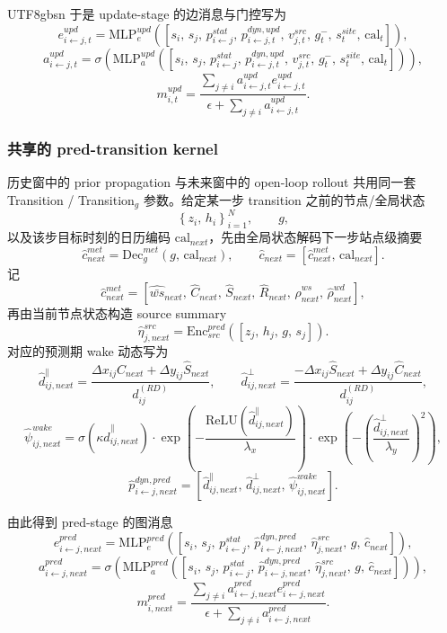 \documentclass[11pt]{article}
\begin{document}
\begin{CJK}{UTF8}{gbsn}
于是 update-stage 的边消息与门控写为
\[
e_{i\leftarrow j,t}^{upd}=\mathrm{MLP}_e^{upd}\left([s_i,\, s_j,\, p_{i\leftarrow j}^{stat},\, p_{i\leftarrow j,t}^{dyn,upd},\, v^{src}_{j,t},\, g_t^-,\, s^{site}_t,\, \mathrm{cal}_t]\right),
\]
\[
a_{i\leftarrow j,t}^{upd}=\sigma\left(\mathrm{MLP}_a^{upd}\left([s_i,\, s_j,\, p_{i\leftarrow j}^{stat},\, p_{i\leftarrow j,t}^{dyn,upd},\, v^{src}_{j,t},\, g_t^-,\, s^{site}_t,\, \mathrm{cal}_t]\right)\right),
\]
\[
m_{i,t}^{upd}=\frac{\sum_{j\neq i} a^{upd}_{i\leftarrow j,t}e^{upd}_{i\leftarrow j,t}}{\epsilon+\sum_{j\neq i} a^{upd}_{i\leftarrow j,t}}.
\]

\subsubsection{共享的 pred-transition kernel}
历史窗中的 prior propagation 与未来窗中的 open-loop rollout 共用同一套
Transition / Transition$_g$ 参数。给定某一步 transition 之前的节点/全局状态
\[
\left\{z_i,\, h_i\right\}_{i=1}^N,\qquad g,
\]
以及该步目标时刻的日历编码 $\mathrm{cal}_{next}$，先由全局状态解码下一步站点级摘要
\[
\hat c^{met}_{next}=\mathrm{Dec}^{met}_g\left(g,\, \mathrm{cal}_{next}\right),\qquad
\hat c_{next}=\left[\hat c^{met}_{next},\, \mathrm{cal}_{next}\right].
\]
记
\[
\hat c^{met}_{next}=
\left[
  \hat{\bar{ws}}_{next},\,
  \hat C_{next},\,
  \hat S_{next},\,
  \hat R_{next},\,
  \hat\rho^{ws}_{next},\,
  \hat\rho^{wd}_{next}
\right],
\]
再由当前节点状态构造 source summary
\[
\hat\eta^{src}_{j,next}=\mathrm{Enc}^{pred}_{src}\left([z_j,\, h_j,\, g,\, s_j]\right).
\]
对应的预测期 wake 动态写为
\[
\hat d^{\parallel}_{ij,next}=\frac{\Delta x_{ij}\hat C_{next}+\Delta y_{ij}\hat S_{next}}{d^{(RD)}_{ij}},
\qquad
\hat d^{\perp}_{ij,next}=\frac{-\Delta x_{ij}\hat S_{next}+\Delta y_{ij}\hat C_{next}}{d^{(RD)}_{ij}},
\]
\[
\hat\psi^{wake}_{ij,next}=\sigma\!\left(\kappa \hat d^{\parallel}_{ij,next}\right)\cdot
\exp\!\left(-\frac{\mathrm{ReLU}(\hat d^{\parallel}_{ij,next})}{\lambda_x}\right)\cdot
\exp\!\left(-\left(\frac{\hat d^{\perp}_{ij,next}}{\lambda_y}\right)^2\right),
\]
\[
\hat p^{dyn,pred}_{i\leftarrow j,next}=\left[\hat d^{\parallel}_{ij,next},\, \hat d^{\perp}_{ij,next},\, \hat\psi^{wake}_{ij,next}\right].
\]

由此得到 pred-stage 的图消息
\[
e^{pred}_{i\leftarrow j,next}=\mathrm{MLP}_e^{pred}\left([s_i,\, s_j,\, p^{stat}_{i\leftarrow j},\, \hat p^{dyn,pred}_{i\leftarrow j,next},\, \hat\eta^{src}_{j,next},\, g,\, \hat c_{next}]\right),
\]
\[
a^{pred}_{i\leftarrow j,next}=\sigma\left(\mathrm{MLP}_a^{pred}\left([s_i,\, s_j,\, p^{stat}_{i\leftarrow j},\, \hat p^{dyn,pred}_{i\leftarrow j,next},\, \hat\eta^{src}_{j,next},\, g,\, \hat c_{next}]\right)\right),
\]
\[
m^{pred}_{i,next}=\frac{\sum_{j\neq i} a^{pred}_{i\leftarrow j,next}e^{pred}_{i\leftarrow j,next}}{\epsilon+\sum_{j\neq i} a^{pred}_{i\leftarrow j,next}}.
\]


\end{CJK}
\end{document}
